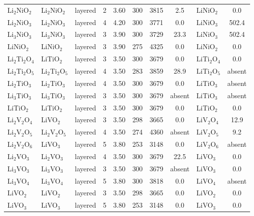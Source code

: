 \documentclass[10pt]{article}
\begin{document}
\begin{center}
\begin{longtable}{l l l c c c c c l c}
Li$_{2}$NiO$_{2}$ & Li$_{2}$NiO$_{2}$ & layered & 2 & 3.60 & 300 & 3815 & 2.5 & LiNiO$_{2}$ & 0.0 \\
Li$_{2}$NiO$_{3}$ & Li$_{2}$NiO$_{3}$ & layered & 4 & 4.20 & 300 & 3771 & 0.0 & LiNiO$_{3}$ & 502.4 \\
Li$_{3}$NiO$_{3}$ & Li$_{3}$NiO$_{3}$ & layered & 3 & 3.90 & 300 & 3729 & 23.3 & LiNiO$_{3}$ & 502.4 \\
LiNiO$_{2}$ & LiNiO$_{2}$ & layered & 3 & 3.90 & 275 & 4325 & 0.0 & LiNiO$_{2}$ & 0.0 \\
Li$_{2}$Ti$_{2}$O$_{4}$ & LiTiO$_{2}$ & layered & 3 & 3.50 & 300 & 3679 & 0.0 & LiTi$_{2}$O$_{4}$ & 0.0 \\
Li$_{2}$Ti$_{2}$O$_{5}$ & Li$_{2}$Ti$_{2}$O$_{5}$ & layered & 4 & 3.50 & 283 & 3859 & 28.9 & LiTi$_{2}$O$_{5}$ & absent \\
Li$_{2}$TiO$_{3}$ & Li$_{2}$TiO$_{3}$ & layered & 4 & 3.50 & 300 & 3679 & 0.0 & LiTiO$_{3}$ & absent \\
Li$_{3}$TiO$_{3}$ & Li$_{3}$TiO$_{3}$ & layered & 3 & 3.50 & 300 & 3679 & absent & LiTiO$_{3}$ & absent \\
LiTiO$_{2}$ & LiTiO$_{2}$ & layered & 3 & 3.50 & 300 & 3679 & 0.0 & LiTiO$_{2}$ & 0.0 \\
Li$_{2}$V$_{2}$O$_{4}$ & LiVO$_{2}$ & layered & 3 & 3.50 & 298 & 3665 & 0.0 & LiV$_{2}$O$_{4}$ & 12.9 \\
Li$_{2}$V$_{2}$O$_{5}$ & Li$_{2}$V$_{2}$O$_{5}$ & layered & 4 & 3.50 & 274 & 4360 & absent & LiV$_{2}$O$_{5}$ & 9.2 \\
Li$_{2}$V$_{2}$O$_{6}$ & LiVO$_{3}$ & layered & 5 & 3.80 & 253 & 3148 & 0.0 & LiV$_{2}$O$_{6}$ & absent \\
Li$_{2}$VO$_{3}$ & Li$_{2}$VO$_{3}$ & layered & 4 & 3.50 & 300 & 3679 & 22.5 & LiVO$_{3}$ & 0.0 \\
Li$_{3}$VO$_{3}$ & Li$_{3}$VO$_{3}$ & layered & 3 & 3.50 & 300 & 3679 & absent & LiVO$_{3}$ & 0.0 \\
Li$_{3}$VO$_{4}$ & Li$_{3}$VO$_{4}$ & layered & 5 & 3.80 & 300 & 3818 & 0.0 & LiVO$_{4}$ & absent \\
LiVO$_{2}$ & LiVO$_{2}$ & layered & 3 & 3.50 & 298 & 3665 & 0.0 & LiVO$_{2}$ & 0.0 \\
LiVO$_{3}$ & LiVO$_{3}$ & layered & 5 & 3.80 & 253 & 3148 & 0.0 & LiVO$_{3}$ & 0.0 \\
\hline
\end{longtable}
\end{center}
\end{document}
